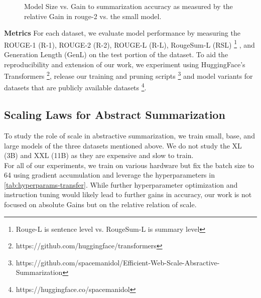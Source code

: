 \begin{figure}
    \centering
    \caption{Model Size vs. Gain to summarization accuracy as measured by the relative Gain in rouge-2 vs. the small model.}
    \label{fig:scale-laws}
\end{figure}
\textbf{Metrics} For each dataset, we evaluate model performance by measuring the ROUGE-1 (R-1), ROUGE-2 (R-2), ROUGE-L (R-L), RougeSum-L (RSL) \footnote{Rouge-L is sentence level vs. RougeSum-L is summary level} \cite{lin-2004-rouge}, and Generation Length (GenL) on the test portion of the dataset. To aid the reproducibility and extension of our work, we experiment using HuggingFace's Transformers \footnote{https://github.com/huggingface/transformers}, release our training and pruning scripts \footnote{https://github.com/spacemanidol/Efficient-Web-Scale-Absractive-Summarization} and model variants for datasets that are publicly available datasets  \footnote{https://huggingface.co/spacemanidol}. 
\subsection{Scaling Laws for Abstract Summarization}
To study the role of scale in abstractive summarization, we train small, base, and large models of the three datasets mentioned above. We do not study the XL (3B) and XXL (11B) as they are expensive and slow to train.\\ For all of our experiments, we train on various hardware but fix the batch size to 64 using gradient accumulation and leverage the hyperparameters in \ref{tab:hyperparams-transfer}. While further hyperparameter optimization and instruction tuning would likely lead to further gains in accuracy, our work is not focused on absolute Gains but on the relative relation of scale.  \\

